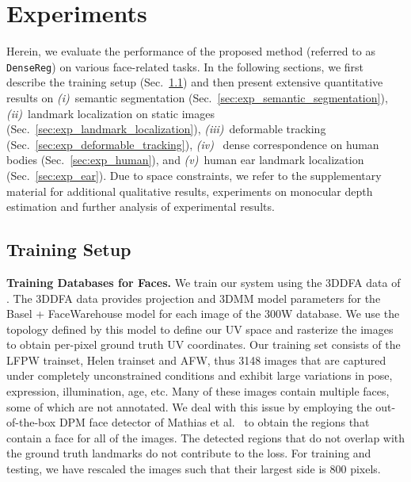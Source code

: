 \section{Experiments}
\label{sec:experiments}
Herein, we evaluate the performance of the proposed method (referred to as \texttt{DenseReg}) on various face-related tasks. 
In the following sections, we first describe the training setup (Sec.~\ref{sec:training_setup}) and then present extensive quantitative results on \emph{(i)}~semantic segmentation (Sec.~\ref{sec:exp_semantic_segmentation}), \emph{(ii)}~landmark localization on static images (Sec.~\ref{sec:exp_landmark_localization}), \emph{(iii)}~deformable tracking (Sec.~\ref{sec:exp_deformable_tracking}), \emph{(iv)}~ dense correspondence on human bodies (Sec.~\ref{sec:exp_human}), and \emph{(v)}~human ear landmark localization (Sec.~\ref{sec:exp_ear}).
Due to space constraints, we refer to the supplementary material for additional qualitative results, experiments on monocular depth estimation and further analysis of experimental results.


\subsection{Training Setup}
\label{sec:training_setup}

\textbf{Training Databases for Faces.} We train our system using the 3DDFA data of \cite{zhu2016face}. The 3DDFA data provides projection and 3DMM model parameters for the Basel \cite{paysan20093d} + FaceWarehouse \cite{cao2014facewarehouse} model for each image of the 300W database. We use the topology defined by this model to define our UV space and rasterize the images to obtain per-pixel ground truth UV coordinates.  Our training set consists of the LFPW trainset, Helen trainset and AFW, thus 3148 images
that are captured under completely unconstrained conditions
and exhibit large variations in pose, expression, illumination,
age, etc.
 Many of these images contain multiple faces, some of which are not annotated. We deal with this issue by employing the out-of-the-box DPM face detector of Mathias et al.~\cite{mathias2014face} to obtain the regions that contain a face for all of the images. The detected regions that do not overlap with the ground truth landmarks do not contribute to the loss. For training and testing, we have rescaled the images such that their largest side is 800 pixels.
 
